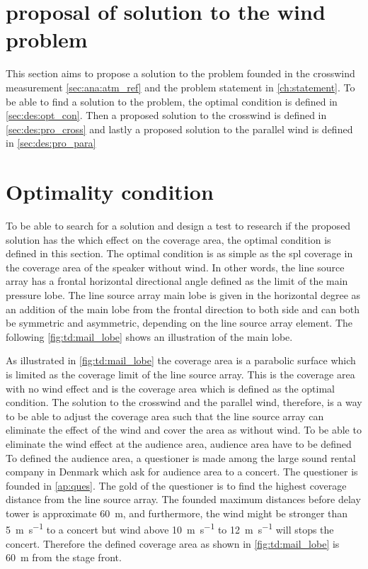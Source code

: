 \section{proposal of solution to the wind problem}\label{sec:td:pro_sol_pro}

This section aims to propose a solution to the problem founded in the crosswind measurement \autoref{sec:ana:atm_ref} and the problem statement in \autoref{ch:statement}. To be able to find a solution to the problem, the optimal condition is defined in \autoref{sec:des:opt_con}. Then a proposed solution to the crosswind is defined in \autoref{sec:des:pro_cross} and lastly a proposed solution to the parallel wind is defined in \autoref{sec:des:pro_para}


\section{Optimality condition}\label{sec:des:opt_con}

To be able to search for a solution and design a test to research if the proposed solution has the which effect on the coverage area, the optimal condition is defined in this section. The optimal condition is as simple as the \gls{spl} coverage in the coverage area of the speaker without wind. In other words, the line source array has a frontal horizontal directional angle defined as the  limit of the main pressure lobe. The line source array main lobe is given in the horizontal degree as an addition of the main lobe from the frontal direction to both side and can both be symmetric and asymmetric, depending on the line source array element. The following \autoref{fig:td:mail_lobe} shows an illustration of the main lobe. 


As illustrated in \autoref{fig:td:mail_lobe} the coverage area is a parabolic surface which is limited as the  coverage limit of the line source array. This is the coverage area with no wind effect and is the coverage area which is defined as the optimal condition. The solution to the crosswind and the parallel wind, therefore, is a way to be able to adjust the coverage area such that the line source array can eliminate the effect of the wind and cover the area as without wind. To be able to eliminate the wind effect at the audience area, audience area have to be defined To defined the audience area, a questioner is made among the large sound rental company in Denmark which ask for audience area to a concert. The questioner is founded in \autoref{ap:ques}. The gold of the questioner is to find the highest coverage distance from the line source array. The founded maximum distances before delay tower is approximate \SI{60}{\meter}, and furthermore, the wind might be stronger than \SI{5}{\meter\per\second} to a concert but wind above \SI{10}{\meter\per\second} to \SI{12}{\meter\per\second} will stops the concert. Therefore the defined coverage area as shown in \autoref{fig:td:mail_lobe} is \SI{60}{\meter} from the stage front.



